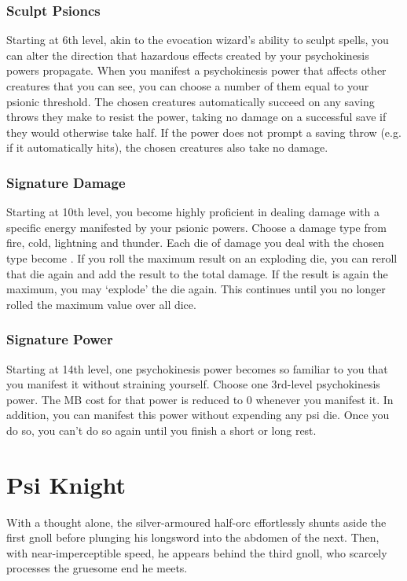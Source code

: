\subsubsection{Sculpt Psioncs}
Starting at 6th level,
akin to the evocation wizard's ability to sculpt spells,
you can alter the direction that hazardous effects
created by your psychokinesis powers propagate.
When you manifest a psychokinesis power that affects
other creatures that you can see,
you can choose a number of them equal to your
psionic threshold.
The chosen creatures automatically succeed on any saving
throws they make to resist the power,
taking no damage on a successful save if they would
otherwise take half.
If the power does not prompt a saving throw
(e.g. if it automatically hits),
the chosen creatures also take no damage.

\subsubsection{Signature Damage}
Starting at 10th level,
you become highly proficient in dealing damage
with a specific energy manifested by your psionic powers.
Choose a damage type from fire, cold, lightning and thunder.
Each die of damage you deal with the chosen type
become .
If you roll the maximum result on an exploding die,
you can reroll that die again and add the result to the
total damage.
If the result is again the maximum,
you may `explode' the die again.
This continues until you no
longer rolled the maximum value over all dice.

\subsubsection{Signature Power}
Starting at 14th level,
one psychokinesis power becomes so familiar to you that you
manifest it without straining yourself.
Choose one 3rd-level psychokinesis power.
The MB cost for that power is reduced to 0 whenever you manifest it.
In addition, you can manifest this power without expending
any psi die.
Once you do so,
you can't do so again until you finish a short or long rest.

\clearpage\section{Psi Knight}
\label{sec:psi_knight}
\DndSetThemeColor[DmgCoral]
With a thought alone, the silver-armoured half-orc effortlessly
shunts aside the first gnoll before plunging his longsword
into the abdomen of the next.
Then, with near-imperceptible speed, he appears behind the third gnoll,
who scarcely processes the gruesome end he meets.

